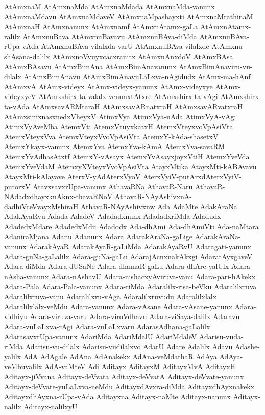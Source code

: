 {AtAmxnaM
AtAmxnaMda
AtAmxnaMdada
AtAmxnaMda-vanunx
AtAmxnaMdavu
AtAmxnaMdaveV
AtAmxnaMpashayxti
AtAmxnaMrathinaM
AtAmxnaH
AtAmxnanunx
AtAmxnamf
AtAmxnAtamx-gaLa
AtAmxnAtamx-ralilx
AtAmxnuBava
AtAmxnuBavavu
AtAmxnuBAva-diMda
AtAmxnuBAva-rUpa-vAda
AtAmxnuBAva-vilalxda-varU
AtAmxnuBAva-vilalxde
AtAmxnu-shAsana-dalilx
AtAmxnoVvuyxcacxranitx
AtAmxnAnxdoV
AtAmxBAsa
AtAmxBAsavu
AtAmxBimAna
AtAmxBimAnavanunx
AtAmxBimAnaviru-vu-dilalx
AtAmxBimAnavu
AtAmxBimAnavuLaLxva-nAgidudx
AtAmx-ma-hAnf
AtAmxvA
AtAmx-videyx
AtAmx-videyx-yanunx
AtAmx-videyxye
AtAmx-videyxyeV
AtAmxshirx-ta-valalx-venunxtAtxre
AtAmxshirx-ta-vAgi
AtAmxshirx-ta-vAda
AtAmxsavARMtaraH
AtAmxsavARnatxraH
AtAmxsavARvatxraH
AtAmxsimxnasxnedxVheyxV
AtimxVya
AtimxVya-nAda
AtimxVyA-vAgi
AtimxVyAveMba
AtemxVti
AtemxVtuyxkatxH
AtemxVteyxvoVpAsiVta
AtemxVteyxVva
AtemxVteyxVvoVpAsiVta
AtemxY-kAda-shasetxV
AtemxYkayx-vanunx
AtemxYva
AtemxYva-kAmA
AtemxYva-savaRM
AtemxYvAdhasAtxtf
AtemxY-vAsayx
AtemxYvAsayxjoyxVtiH
AtemxYveVda
AtemxYveVdaM
AtemxyXVteyxVvoVpAsiVta
AtayxMtika
AtayxMti-kABAvavu
AtayxMti-kAlayave
AterxV-yAdAterxVyoV
AterxVyiV-putArxdAterxVyiV-putorxV
AtavxsavxrUpa-vanunx
AthavaRNa
AthavaR-Naru
AthavaR-NAdadxdhayxknAknx-thavaRNoV
AthavaR-NAyAshivxnA-dadhiVceVvayxMshiraH
AthavaR-NAyAshivxnw
Ada
AdaMte
AdakAraNa
AdakAyaRvu
Adada
AdadeV
Adadadxnunx
AdadadxriMda
Adadudx
AdadedxMdare
AdadedxMdu
Adadodx
Ada-dhAmi
Ada-dhAmiVti
Ada-naMtara
AdaniraMjana
Adanu
Adanunx
Adara
AdarakAraNa-gaLige
AdarakAraNa-vanunx
AdarakAyaR
AdarakAyaR-gaLiMda
AdarakAyaRvU
Adaragati-yanunx
Adara-guNa-gaLalilx
Adara-guNa-gaLu
AdarajAcnxnakAkxgi
AdaratAyxgaveV
Adara-diMda
Adara-dUSaNe
Adara-dhamaR-gaLu
Adara-dhAre-yalUlx
Adara-nAsha-vanunx
Adara-nAshavU
Adara-nishacxyAviruva-vanu
Adara-pari-hAkekx
Adara-Pala
Adara-Pala-vanunx
Adara-riMda
Adaralilx-risa-beVku
Adaralilxruva
Adaralilxruva-vanu
Adaralilxru-vAga
Adaralilxruvudu
Adaralilxlalx
Adaralilxlalx-veMdu
Adara-vanunx
Adara-vAsane
Adara-vAsane-yanunx
Adara-vidhiyu
Adara-viruva-varu
Adara-viroVdhavu
Adara-viSaya-dalilx
Adaravu
Adara-vuLaLxva-rAgi
Adara-vuLaLxvaru
AdarasAdhana-gaLalilx
AdarasavxrUpa-vanunx
AdariMda
AdariMdalU
AdariMdaleV
Adarisu-vuda-riMda
Adarisu-vu-dilalx
Adarisu-vudilalxvo
AdarU
Adare
Adalilx
Adavu
Adashe-yalilx
AdA
AdAgale
AdAna
AdAnakekx
AdAna-veMdathaR
AdAya
AdAya-veMbuvalilx
AdA-vaMteV
Adi
Aditayx
AditayxM
AditayxMvA
AditayxH
Aditayx-jiVvana
Aditayx-deVvata
Aditayx-deVvatA
Aditayx-deVvate-yanunx
Aditayx-deVvate-yuLaLxva-neMdu
AditayxdAvxra-diMda
AditayxdhAyxnakekx
AditayxdhAyxna-rUpa-vAda
Aditayxna
Aditayx-naMte
Aditayx-nanunx
Aditayx-nalilx
Aditayx-nalilxyU
}
